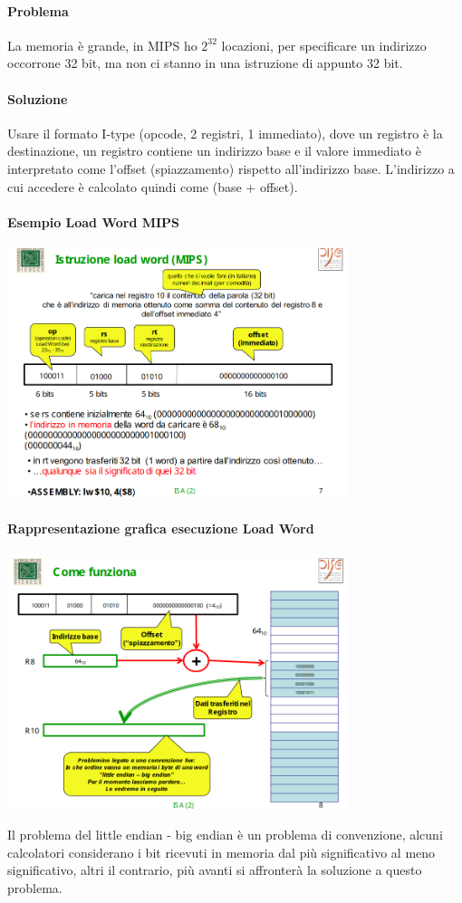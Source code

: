 \documentclass[12pt, a4paper, openany]{book}
\begin{document}
\paragraph{Problema} La memoria è grande, in MIPS ho $2^32$ locazioni, 
per specificare un indirizzo occorrone 32 bit, ma non ci stanno in una istruzione di appunto
32 bit. 
\paragraph*{Soluzione} Usare il formato I-type (opcode, 2 registri, 1 immediato), dove un
registro è la destinazione, un registro contiene un indirizzo base e il valore immediato
è interpretato come l'offset (spiazzamento) rispetto all'indirizzo base.
L'indirizzo a cui accedere è calcolato quindi come (base + offset).
\paragraph*{Esempio Load Word MIPS}
\begin{center}
    \includegraphics[width=100mm, scale=0.5]{load and store.png}
\end{center}
\paragraph*{Rappresentazione grafica esecuzione Load Word}
\begin{center}
    \includegraphics[width=100mm, scale=0.5]{funzionamento ld.png}
\end{center}
Il problema del little endian - big endian è un problema di convenzione,
alcuni calcolatori considerano i bit ricevuti in memoria dal più significativo
al meno significativo, altri il contrario, più avanti si affronterà la soluzione
a questo problema.
\end{document}
